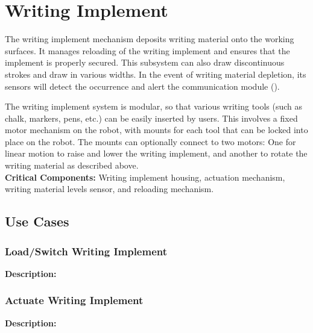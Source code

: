 
\section{Writing Implement}
\label{sec:writing_implement}
The writing implement mechanism deposits writing material onto the working surfaces. It manages reloading of the writing implement and ensures that the implement is properly secured. This subsystem can also draw discontinuous  strokes and draw in various widths. In the event of writing material depletion, its sensors will detect the occurrence and alert the communication module (). 

The writing implement system is modular, so that various writing tools (such as chalk, markers, pens, etc.) can be easily inserted by users. This involves a fixed motor mechanism on the robot, with mounts for each tool that can be locked into place on the robot. The mounts can optionally connect to two motors: One for linear motion to raise and lower the writing implement, and another to rotate the writing material as described above.\\

\noindent
\textbf{Critical Components:} Writing implement housing, actuation mechanism, writing material levels sensor, and reloading mechanism. 


\subsection{Use Cases}

\subsubsection{Load/Switch Writing Implement}
\textbf{Description:} 

\subsubsection{Actuate Writing Implement}
\textbf{Description:} 

